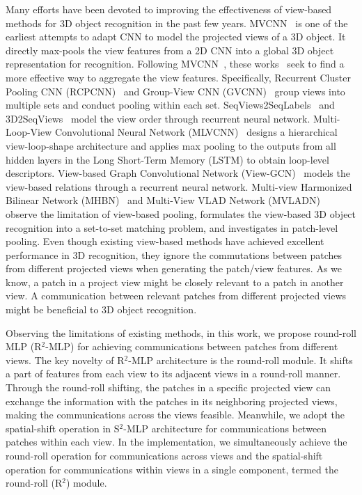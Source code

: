 \documentclass[11pt]{article}
\begin{document}
Many efforts have been devoted to improving the effectiveness of view-based methods for 3D object recognition in the past few years. MVCNN~\citep{su2015multi} is one of the earliest attempts to adapt CNN to model the projected views of a 3D object. It directly max-pools the view features from a 2D CNN into a global 3D object representation for recognition. Following MVCNN~\citep{su2015multi}, these works~\citep{feng2018gvcnn,han20193d2seqvies,han2019seqview2seqlabels,wang2017dominant,kanezaki2018rotationnet,wei2020view} seek to find a more effective way to aggregate the view features. Specifically, Recurrent Cluster Pooling CNN (RCPCNN)~\citep{wang2017dominant} and Group-View CNN (GVCNN)~\citep{feng2018gvcnn} group views into multiple sets and conduct pooling within each set. SeqViews2SeqLabels~\citep{han2019seqview2seqlabels} and 3D2SeqViews~\citep{han20193d2seqvies} model the view order through recurrent neural network. Multi-Loop-View Convolutional Neural Network (MLVCNN)~\citep{jiang2019mlvcnn} designs a hierarchical view-loop-shape architecture and applies max pooling to the outputs from all hidden layers in the Long Short-Term Memory (LSTM) to obtain loop-level descriptors. View-based Graph Convolutional Network (View-GCN)~\citep{wei2020view} models the view-based relations through a recurrent neural network. Multi-view Harmonized Bilinear Network (MHBN)~\citep{yu2018multi} and Multi-View VLAD Network (MVLADN)~\citep{yu20213d} observe the limitation of view-based pooling, formulates the view-based 3D object recognition into a set-to-set matching problem, and investigates in patch-level pooling. Even though existing view-based methods have achieved excellent performance in 3D recognition,  they ignore the commutations between patches from different projected views when generating the patch/view features. As we know, a patch in a project view might be closely relevant to a patch in another view. A communication between relevant patches from different projected views might be beneficial to 3D object recognition.

Observing the limitations of existing methods, in this work, we propose round-roll MLP (R$^2$-MLP) for achieving communications between patches from different views. The key novelty of R$^2$-MLP architecture is the round-roll module. It shifts a part of features from each view to its adjacent views in a round-roll manner. Through the round-roll shifting, the patches in a specific projected view can exchange the information with the patches in its neighboring projected views, making the communications across the views feasible. Meanwhile, we adopt the spatial-shift operation in S$^2$-MLP architecture for communications between patches within each view.  In the implementation, we simultaneously achieve the round-roll operation for communications across views and the spatial-shift operation for communications within views in a single component, termed the round-roll (R$^2$) module.
\end{document}
